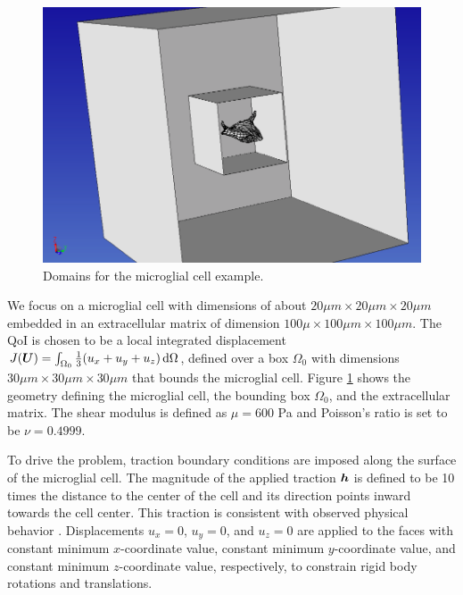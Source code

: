 %
\begin{figure}[ht!]
\centering
\includegraphics[width=.75\linewidth]{img/aut_glial_geom.png}
\caption{Domains for the microglial cell example.}
\label{fig:aut_glial_geom}
\end{figure}

We focus on a microglial cell with dimensions of about
$20 \mu m \times 20 \mu m \times 20 \mu m$ embedded in an extracellular
matrix of dimension $100 \mu \times 100 \mu m \times 100 \mu m$.
The QoI is chosen to be a local integrated displacement
$J(\boldsymbol{U}) = \int_{\Omega_0} \frac13 (u_x + u_y + u_z) \, \text{d} \Omega$,
defined over a box $\Omega_0$ with dimensions
$30 \mu m \times 30 \mu m \times 30 \mu m$
that bounds the microglial cell. Figure \ref{fig:aut_glial_geom} shows
the geometry defining the microglial cell, the bounding box
$\Omega_0$, and the extracellular matrix. The shear modulus
is defined as $\mu = 600$ Pa and Poisson's ratio is set to be
$\nu = 0.4999$.

To drive the problem, traction boundary conditions are imposed along
the surface of the microglial cell. The magnitude of the applied
traction $\boldsymbol{h}$ is defined to be 10 times the distance to the
center of the cell and its direction points inward towards the
cell center. This traction is consistent with observed physical
behavior \cite{dong2017recovery}. Displacements $u_x = 0$,
$u_y=0$, and $u_z=0$ are applied to the faces with constant
minimum $x$-coordinate value, constant minimum $y$-coordinate
value, and constant minimum $z$-coordinate value, respectively,
to constrain rigid body rotations and translations.

